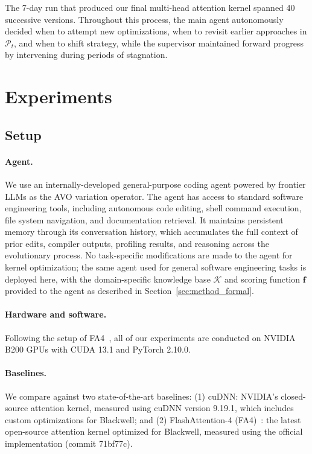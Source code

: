 \documentclass{article}
\begin{document}
The 7-day run that produced our final multi-head attention kernel spanned 40 successive versions. Throughout this process, the main agent autonomously decided when to attempt new optimizations, when to revisit earlier approaches in $\mathcal{P}_t$, and when to shift strategy, while the supervisor maintained forward progress by intervening during periods of stagnation.

\section{Experiments}
\label{sec:experiments}

\subsection{Setup}
\label{sec:setup}

\paragraph{Agent.}
We use an internally-developed general-purpose coding agent powered by frontier LLMs as the AVO variation operator.
The agent has access to standard software engineering tools, including autonomous code editing, shell command execution, file system navigation, and documentation retrieval.
It maintains persistent memory through its conversation history, which accumulates the full context of prior edits, compiler outputs, profiling results, and reasoning across the evolutionary process.
No task-specific modifications are made to the agent for kernel optimization; the same agent used for general software engineering tasks is deployed here, with the domain-specific knowledge base $\mathcal{K}$ and scoring function $\mathbf{f}$ provided to the agent as described in Section~\ref{sec:method_formal}.

\paragraph{Hardware and software.}
Following the setup of FA4~\citep{zadouri2026flashattention4}, all of our experiments are conducted on NVIDIA B200 GPUs with CUDA 13.1 and PyTorch 2.10.0.

\paragraph{Baselines.}
We compare against two state-of-the-art baselines:
(1) cuDNN: NVIDIA's closed-source attention kernel, measured using cuDNN version 9.19.1, which includes custom optimizations for Blackwell; and
(2) FlashAttention-4 (FA4)~\citep{zadouri2026flashattention4}: the latest open-source attention kernel optimized for Blackwell, measured using the official implementation (commit 71bf77c).
\end{document}
